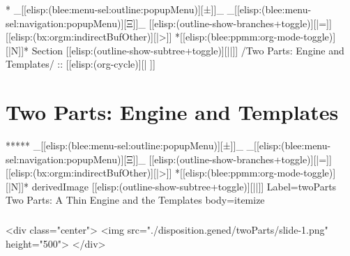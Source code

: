 \begin{whenOrg}
\begin{verblatex}
\begin{frame}[fragile,plain,label=orgNotMarkdown]
{}

\end{frame}
\end{verblatex}



\begin{whenOrg}
*  _[[elisp:(blee:menu-sel:outline:popupMenu)][±]]_ _[[elisp:(blee:menu-sel:navigation:popupMenu)][Ξ]]_ [[elisp:(outline-show-branches+toggle)][|=]] [[elisp:(bx:orgm:indirectBufOther)][|>]] *[[elisp:(blee:ppmm:org-mode-toggle)][|N]]*  Section    [[elisp:(outline-show-subtree+toggle)][||]]   /Two Parts: Engine and Templates/ ::  [[elisp:(org-cycle)][| ]]
\end{whenOrg}

\section{Two Parts: Engine and Templates}

\begin{whenOrg}
*****  _[[elisp:(blee:menu-sel:outline:popupMenu)][±]]_ _[[elisp:(blee:menu-sel:navigation:popupMenu)][Ξ]]_ [[elisp:(outline-show-branches+toggle)][|=]] [[elisp:(bx:orgm:indirectBufOther)][|>]] *[[elisp:(blee:ppmm:org-mode-toggle)][|N]]*  derivedImage [[elisp:(outline-show-subtree+toggle)][||]] Label=twoParts Two Parts: A Thin Engine and the Templates body=itemize
\end{whenOrg}

\begin{htmlonly}

\begin{frame}[fragile,plain,label=twoParts]
    \frametitle{}
    \framesubtitle{}
    \begin{rawhtml}
<div class="center">
<img src="./disposition.gened/twoParts/slide-1.png" height="500">
</div>
    \end{rawhtml}
\end{frame}
\end{htmlonly}

\begin{verblatex}


\end{verblatex}
\end{whenOrg}
